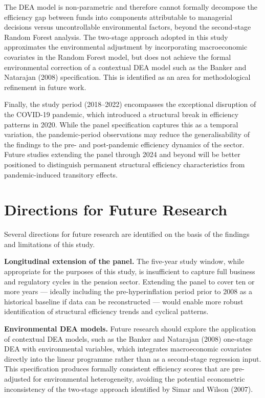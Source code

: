 \documentclass[12pt,a4paper]{article}
\begin{document}
The DEA model is non-parametric and therefore cannot formally decompose the efficiency gap between funds into components attributable to managerial decisions versus uncontrollable environmental factors, beyond the second-stage Random Forest analysis. The two-stage approach adopted in this study approximates the environmental adjustment by incorporating macroeconomic covariates in the Random Forest model, but does not achieve the formal environmental correction of a contextual DEA model such as the Banker and Natarajan (2008) specification. This is identified as an area for methodological refinement in future work.

Finally, the study period (2018--2022) encompasses the exceptional disruption of the COVID-19 pandemic, which introduced a structural break in efficiency patterns in 2020. While the panel specification captures this as a temporal variation, the pandemic-period observations may reduce the generalisability of the findings to the pre- and post-pandemic efficiency dynamics of the sector. Future studies extending the panel through 2024 and beyond will be better positioned to distinguish permanent structural efficiency characteristics from pandemic-induced transitory effects.

\section{Directions for Future Research}

Several directions for future research are identified on the basis of the findings and limitations of this study.

\textbf{Longitudinal extension of the panel.} The five-year study window, while appropriate for the purposes of this study, is insufficient to capture full business and regulatory cycles in the pension sector. Extending the panel to cover ten or more years --- ideally including the pre-hyperinflation period prior to 2008 as a historical baseline if data can be reconstructed --- would enable more robust identification of structural efficiency trends and cyclical patterns.

\textbf{Environmental DEA models.} Future research should explore the application of contextual DEA models, such as the Banker and Natarajan (2008) one-stage DEA with environmental variables, which integrates macroeconomic covariates directly into the linear programme rather than as a second-stage regression input. This specification produces formally consistent efficiency scores that are pre-adjusted for environmental heterogeneity, avoiding the potential econometric inconsistency of the two-stage approach identified by Simar and Wilson (2007).
\end{document}
